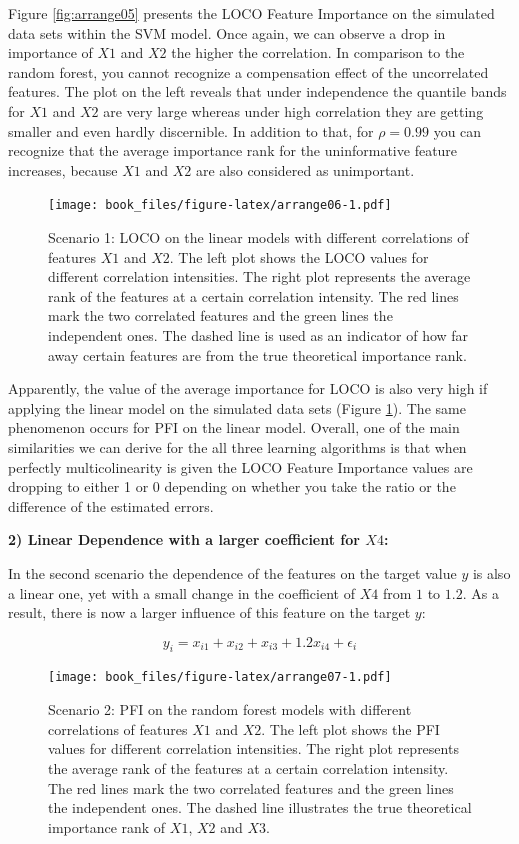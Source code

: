\documentclass[
]{krantz}
\begin{document}
Figure \ref{fig:arrange05} presents the LOCO Feature Importance on the simulated data sets within the SVM model. Once again, we can observe a drop in importance of \(X1\) and \(X2\) the higher the correlation. In comparison to the random forest, you cannot recognize a compensation effect of the uncorrelated features. The plot on the left reveals that under independence the quantile bands for \(X1\) and \(X2\) are very large whereas under high correlation they are getting smaller and even hardly discernible. In addition to that, for \(\rho=0.99\) you can recognize that the average importance rank for the uninformative feature increases, because \(X1\) and \(X2\) are also considered as unimportant.

\begin{figure}
\centering
\texttt{[image: book\_files/figure-latex/arrange06-1.pdf]}
\caption{\label{fig:arrange06}Scenario 1: LOCO on the linear models with different correlations of features \(X1\) and \(X2\). The left plot shows the LOCO values for different correlation intensities. The right plot represents the average rank of the features at a certain correlation intensity. The red lines mark the two correlated features and the green lines the independent ones. The dashed line is used as an indicator of how far away certain features are from the true theoretical importance rank.}
\end{figure}

Apparently, the value of the average importance for LOCO is also very high if applying the linear model on the simulated data sets (Figure \ref{fig:arrange06}). The same phenomenon occurs for PFI on the linear model. Overall, one of the main similarities we can derive for the all three learning algorithms is that when perfectly multicolinearity is given the LOCO Feature Importance values are dropping to either 1 or 0 depending on whether you take the ratio or the difference of the estimated errors.

\textbf{2) Linear Dependence with a larger coefficient for \(X4\):}

In the second scenario the dependence of the features on the target value \(y\) is also a linear one, yet with a small change in the coefficient of \(X4\) from \(1\) to \(1.2\). As a result, there is now a larger influence of this feature on the target \(y\):

\[
y_{i} = x_{i1}+x_{i2}+x_{i3}+1.2x_{i4}+\epsilon_{i}
\]

\begin{figure}
\centering
\texttt{[image: book\_files/figure-latex/arrange07-1.pdf]}
\caption{\label{fig:arrange07}Scenario 2: PFI on the random forest models with different correlations of features \(X1\) and \(X2\). The left plot shows the PFI values for different correlation intensities. The right plot represents the average rank of the features at a certain correlation intensity. The red lines mark the two correlated features and the green lines the independent ones. The dashed line illustrates the true theoretical importance rank of \(X1\), \(X2\) and \(X3\).}
\end{figure}
\end{document}

